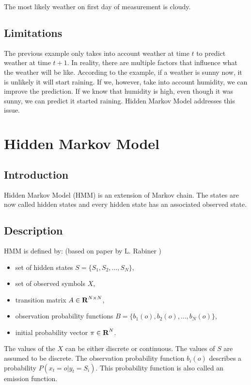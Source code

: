 \documentclass[thesis=B,english]{FITthesis}[2012/06/26]
\begin{document}
The most likely weather on first day of measurement is cloudy.

\subsection{Limitations}

The previous example only takes into account weather at time $t$ to predict weather at time $t+1$. In reality, there are multiple factors that influence what the weather will be like. According to the example, if a weather is sunny now, it is unlikely it will start raining. If we, however, take into account humidity, we can improve the prediction. If we know that humidity is high, even though it was sunny, we can predict it started raining. Hidden Markov Model addresses this issue.

\section{Hidden Markov Model}

\subsection{Introduction}

Hidden Markov Model (HMM) is an extension of Markov chain. The states are now called hidden states and every hidden state has an associated observed state.

\subsection{Description}

HMM is defined by: (based on paper by L. Rabiner \cite{hmm-lawrence})
\begin{itemize}

\item set of hidden states $S = \{S_1, S_2, \dots, S_N\}$,
\item set of observed symbols $X$,
\item transition matrix $A \in \textbf R^{N \times N}$,
\item observation probability functions $B = \{b_1(o), b_2(o), \dots, b_N(o)\}$,
\item initial probability vector $\pi \in \textbf R^N$.

\end{itemize}

The values of the $X$ can be either discrete or continuous. The values of $S$ are assumed to be discrete. The observation probability function $b_i(o)$ describes a probability $P(x_t = o | y_t = S_i)$. This probability function is also called an emission function.
\end{document}
